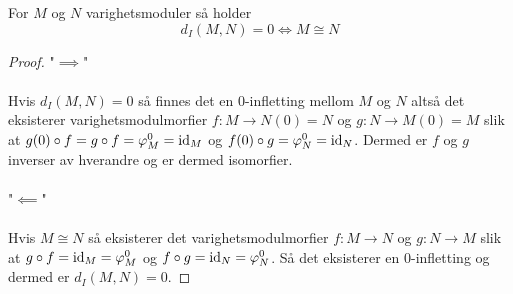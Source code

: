 \begin{proposisjon}\label{Cor:label}
	For $M$ og $N$ varighetsmoduler så holder
	\[d_I(M,N) = 0 \iff M\cong N\]
\end{proposisjon}
\begin{proof}
	"$\implies$"\\\\
	Hvis $d_I(M,N) = 0$ så finnes det en $0$-infletting mellom $M$ og $N$ altså det eksisterer varighetsmodulmorfier $f: M \to N(0)=N$ og $g: N\to M(0)=M$ slik at $g(0)\circ f = g\circ f = \varphi_M^0=\textnormal{id}_M$ og $f(0)\circ g = \varphi_N^0=\textnormal{id}_N$. Dermed er $f$ og $g$ inverser av hverandre og er dermed isomorfier.\\\\
	"$\impliedby$"\\\\
	Hvis $M\cong N$ så eksisterer det varighetsmodulmorfier $f:M\to N$ og $g:N\to M$ slik at $g\circ f = \textnormal{id}_M=\varphi_M^0$ og $f\circ g=\textnormal{id}_N=\varphi_N^0$. Så det eksisterer en $0$-infletting og dermed er $d_I(M,N) = 0$.
\end{proof}

